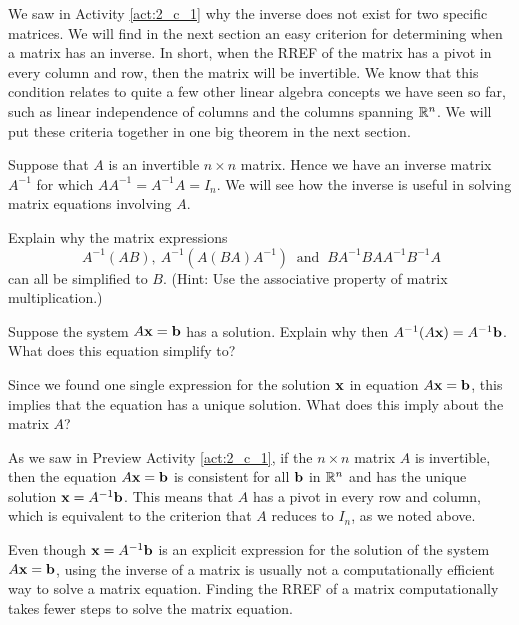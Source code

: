 We saw in Activity \ref{act:2_c_1} why the inverse does not exist for two specific matrices. We will find in the next section an easy criterion for determining when a matrix has an inverse. In short, when the RREF of the matrix has a pivot in every column and row, then the matrix will be invertible. We know that this condition relates to quite a few other linear algebra concepts we have seen so far, such as linear independence of columns and the columns spanning $\mathbb{R}^n$. We will put these criteria together in one big theorem in the next section.



\begin{activity} \label{act:2_c_2} Suppose that $A$ is an invertible $n \times n$ matrix. Hence we have an inverse matrix $A^{-1}$ for which $AA^{-1}=A^{-1}A=I_n$. We will see how the inverse is useful in solving matrix equations involving $A$.

	\ba
	\item Explain why the matrix expressions 
\[\ A^{-1}(AB) , \ A^{-1}(A(BA)A^{-1}) \ \text{ and } \ BA^{-1}BAA^{-1}B^{-1}A\]
can all be simplified to $B$. (Hint: Use the associative property of matrix multiplication.)
	
	
	
	\item Suppose the system $A \mathbf{x} = \mathbf{b}$ has a solution. Explain why then $A^{-1}(A\mathbf{x})= A^{-1}\mathbf{b}$. What does this equation simplify to?
	
	
	
	\item Since we found one single expression for the solution $\mathbf{x}$ in equation $A\mathbf{x}=\mathbf{b}$, this implies that the equation has a unique solution. What does this imply about the matrix $A$? 
	
	
	
	\ea
	
\end{activity}



As we saw in Preview Activity \ref{act:2_c_1}, if the $n \times n$ matrix $A$ is invertible, then the equation $A \mathbf{x} = \mathbf{b}$ is consistent for all $\mathbf{b}$ in $\mathbb{R}^n$ and has the unique solution $\mathbf{x} = A^{-1} \mathbf{b}$. This means that $A$ has a pivot in every row and column, which is equivalent to the criterion that $A$ reduces to $I_n$, as we noted above. 

Even though $\mathbf{x}=A^{-1}\mathbf{b}$ is an explicit expression for the solution of the system $A\mathbf{x}=\mathbf{b}$, using the inverse of a matrix is usually not a computationally efficient way to solve a matrix equation. Finding the RREF of a matrix computationally takes fewer steps to solve the matrix equation. 


